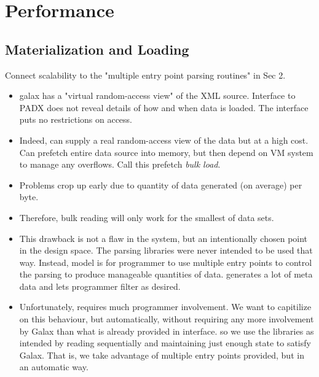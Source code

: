 \section{Performance}
\label{section:performance}

\subsection{Materialization and Loading}

Connect scalability to the "multiple entry point parsing routines" in
Sec 2.
\begin{itemize}
\item galax has a "virtual random-access view" of the XML
  source. Interface to PADX does not reveal details of how and when
  data is loaded. The interface puts no restrictions on access.
\item Indeed, \padx{} can supply a real random-access view of the data but at a
  high cost. Can prefetch entire data source into memory, but then
  depend on VM system to manage any overflows. Call this prefetch {\em
    bulk load}.
\item Problems crop up early due to quantity of data generated (on
  average) per byte.
\item Therefore, bulk reading will only work for the smallest of
  data sets.
\item This drawback is not a flaw in the system, but an intentionally
  chosen point in the design space. The parsing libraries were never
  intended to be used that way. Instead, \pads model is for programmer
  to use multiple entry points to control the parsing to produce
  manageable quantities of data. \pads generates a lot of meta data
  and lets programmer filter as desired.
\item Unfortunately, requires much programmer involvement. We want to
  capitilize on this behaviour, but automatically, without requiring
  any more involvement by Galax than what is already provided in
  interface. so we use the libraries as intended by reading
  sequentially and maintaining just enough state to satisfy
  Galax. That is, we take advantage of multiple entry points provided,
  but in an automatic way.
\end{itemize}


